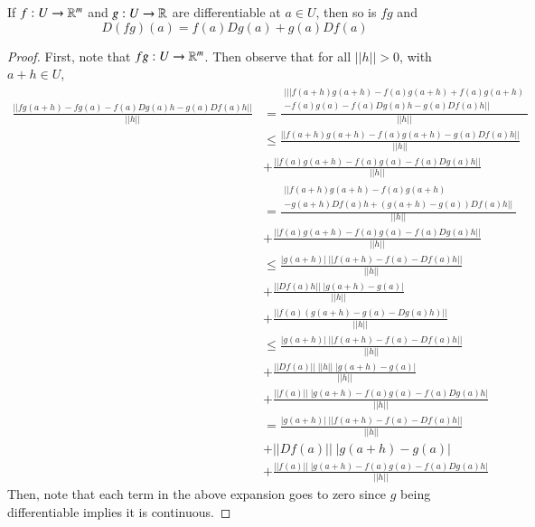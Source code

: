 \begin{proposition}
    If $f:U\rightarrow \mathbb R^m$ and $g:U\rightarrow \mathbb R$ are differentiable at $a \in U$, then so is $fg$ and $$D(fg)(a) = f(a)Dg(a) + g(a)Df(a)$$
\end{proposition}
\begin{proof}
    First, note that $fg:U\rightarrow \mathbb R^m$. Then observe that for all $||h|| > 0$, with $a+h \in U$, \begin{align*}
        \frac{||fg(a+h) - fg(a) - f(a)Dg(a)h-g(a)Df(a)h||}{||h||} &= \frac{\begin{array}{l} |
||f(a+h)g(a+h)-f(a)g(a+h)+f(a)g(a+h) \\ -f(a)g(a)-f(a)Dg(a)h-g(a)Df(a)h||\end{array}}{||h||} \\
        &\leq \frac{||f(a+h)g(a+h)-f(a)g(a+h)-g(a)Df(a)h||}{||h||} \\
        &+ \frac{||f(a)g(a+h)-f(a)g(a)-f(a)Dg(a)h||}{||h||} \\
        &= \frac{\begin{array}{l}||f(a+h)g(a+h)-f(a)g(a+h) \\ -g(a+h)Df(a)h + (g(a+h)-g(a))Df(a)h|| \end{array}}{||h||} \\
        &+ \frac{||f(a)g(a+h)-f(a)g(a)-f(a)Dg(a)h||}{||h||} \\
        &\leq \frac{|g(a+h)|\;||f(a+h)-f(a)-Df(a)h||}{||h||} \\
        &+ \frac{||Df(a)h||\;|g(a+h)-g(a)|}{||h||} \\
        &+ \frac{||f(a)(g(a+h)-g(a)-Dg(a)h)||}{||h||} \\
        &\leq \frac{|g(a+h)|\;||f(a+h)-f(a)-Df(a)h||}{||h||} \\
        &+ \frac{||Df(a)||\;||h||\;|g(a+h)-g(a)|}{||h||} \\
        &+ \frac{||f(a)||\;|g(a+h)-f(a)g(a)-f(a)Dg(a)h|}{||h||} \\
        &= \frac{|g(a+h)|\;||f(a+h)-f(a)-Df(a)h||}{||h||} \\
        &+ ||Df(a)||\;|g(a+h)-g(a)| \\
        &+ \frac{||f(a)||\;|g(a+h)-f(a)g(a)-f(a)Dg(a)h|}{||h||}
    \end{align*}
    Then, note that each term in the above expansion goes to zero since $g$ being differentiable implies it is continuous.
\end{proof}


